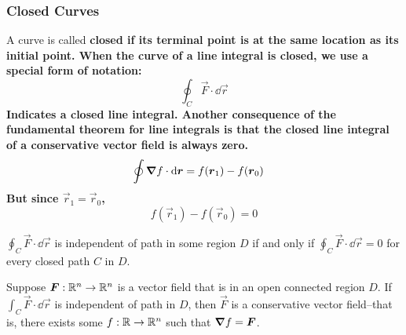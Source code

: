 \subsubsection{Closed Curves}
A curve is called \bf{closed} if its terminal point is at the same location as its initial point. When the curve of a line integral is closed, we use a special form of notation:
\[ \oint_C \vec F \cdot \dd \vec r\]
Indicates a closed line integral. Another consequence of the fundamental theorem for line integrals is that the closed line integral of a conservative vector field is always zero.
\begin{align*}
    \oint\boldsymbol\nabla f\cdot \dd \boldsymbol{r} &= f(\boldsymbol{r}_1) - f(\boldsymbol{r}_0)
\end{align*}
But since $\vec r_1 = \vec r_0$,
\[ f(\vec r_1) - f(\vec r_0) = 0\]
\begin{theorem}
    $\oint_C \vec F \cdot \dd \vec r$ is independent of path in some region $D$ if and only if $\oint_C \vec F \cdot \dd \vec r = 0$ for every closed path $C$ in $D$.
\end{theorem}
\begin{theorem}
\label{clsdpth}
    Suppose $\boldsymbol{F}: \mathbb{R}^n\to\mathbb{R}^n$ is a vector field that is in an open connected region $D$. If $\int_C\vec F\cdot \dd \vec r$ is independent of path in $D$, then $\vec F$ is a conservative vector field--that is, there exists some $f:\mathbb{R}\to\mathbb{R}^n$ such that $\boldsymbol\nabla f = \boldsymbol{F}$. 
\end{theorem}
